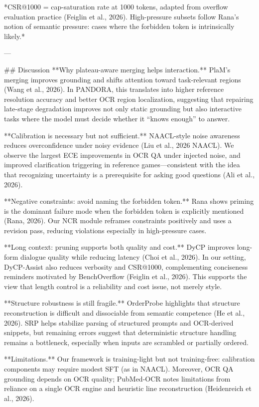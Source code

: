 *CSR@1000 = cap-saturation rate at 1000 tokens, adapted from overflow evaluation practice (Feiglin et al., 2026). High-pressure subsets follow Rana’s notion of semantic pressure: cases where the forbidden token is intrinsically likely.*

---

## Discussion  
**Why plateau-aware merging helps interaction.** PlaM’s merging improves grounding and shifts attention toward task-relevant regions (Wang et al., 2026). In PANDORA, this translates into higher reference resolution accuracy and better OCR region localization, suggesting that repairing late-stage degradation improves not only static grounding but also interactive tasks where the model must decide whether it “knows enough” to answer.

**Calibration is necessary but not sufficient.** NAACL-style noise awareness reduces overconfidence under noisy evidence (Liu et al., 2026 NAACL). We observe the largest ECE improvements in OCR QA under injected noise, and improved clarification triggering in reference games—consistent with the idea that recognizing uncertainty is a prerequisite for asking good questions (Ali et al., 2026).

**Negative constraints: avoid naming the forbidden token.** Rana shows priming is the dominant failure mode when the forbidden token is explicitly mentioned (Rana, 2026). Our NCR module reframes constraints positively and uses a revision pass, reducing violations especially in high-pressure cases.

**Long context: pruning supports both quality and cost.** DyCP improves long-form dialogue quality while reducing latency (Choi et al., 2026). In our setting, DyCP-Assist also reduces verbosity and CSR@1000, complementing conciseness reminders motivated by BenchOverflow (Feiglin et al., 2026). This supports the view that length control is a reliability and cost issue, not merely style.

**Structure robustness is still fragile.** OrderProbe highlights that structure reconstruction is difficult and dissociable from semantic competence (He et al., 2026). SRP helps stabilize parsing of structured prompts and OCR-derived snippets, but remaining errors suggest that deterministic structure handling remains a bottleneck, especially when inputs are scrambled or partially ordered.

**Limitations.** Our framework is training-light but not training-free: calibration components may require modest SFT (as in NAACL). Moreover, OCR QA grounding depends on OCR quality; PubMed-OCR notes limitations from reliance on a single OCR engine and heuristic line reconstruction (Heidenreich et al., 2026).

